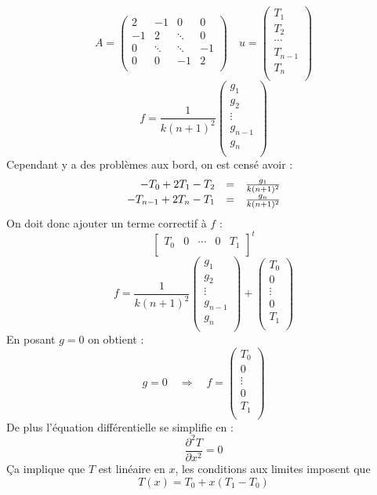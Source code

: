 \documentclass{article}
\begin{document}
\[
	A = 
	\begin{pmatrix}
	2	& 	-1	&	0	& 0	\\
	-1	&	2	&\ddots	& 0	\\
	0	& \ddots&\ddots	&-1	\\
	0	& 	0	& -1 	& 2	\\
	\end{pmatrix}
	\quad u = 
	\begin{pmatrix}
		T_1 \\ T_2 \\ \cdots \\ T_{n-1} \\ T_n \\
	\end{pmatrix}
\]
\[
	f = \frac{1}{k(n+1)^2}
	\begin{pmatrix}
		g_1 \\ g_2 \\ \vdots \\ g_{n-1} \\ g_n \\
	\end{pmatrix}
\]
Cependant y a des problèmes aux bord, on est censé avoir :
\[
	\begin{array}{r c l}
		-T_0 + 2T_1 - T_2 & = & \frac{g_1}{k(n+1)^2}\\
		-T_{n-1} + 2T_n - T_1 & = & \frac{g_n}{k(n+1)^2}\\
	\end{array}
\]
On doit donc ajouter un terme correctif à $f$ :
\[
	\begin{bmatrix}
		T_0 & 0 & \cdots & 0 & T_1 \\
	\end{bmatrix}^t
\]
\[
	f = \frac{1}{k(n+1)^2}
	\begin{pmatrix}
		g_1 \\ g_2 \\ \vdots \\ g_{n-1} \\ g_n \\
	\end{pmatrix} 
	+ \begin{pmatrix}
		T_0 \\ 0 \\ \vdots \\ 0 \\ T_1 \\
	\end{pmatrix}
\]
En posant $g=0$ on obtient :
\[
	g = 0 \quad	\Longrightarrow \quad 
	f = \begin{pmatrix}
		T_0 \\ 0 \\ \vdots \\ 0 \\ T_1 \\
	\end{pmatrix}
\]
De plus l'équation différentielle se simplifie en :
\[
	\frac{\partial^2 T}{\partial x^2} = 0
\]
Ça implique que $T$ est linéaire en $x$, les conditions aux limites imposent que 
\[
	T(x) = T_0 + x(T_1 - T_0)
\]
\end{document}
